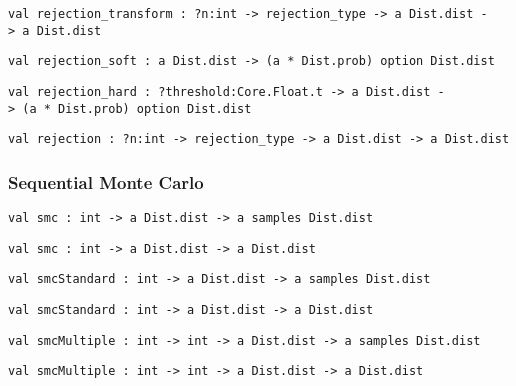 \protect\hyperlink{val-rejectionux5ftransform}{}\texttt{val\ rejection\_transform\ :\ ?⁠n:int\ -\textgreater{}\ rejection\_type\ -\textgreater{}\ \textquotesingle{}a\ Dist.dist\ -\textgreater{}\ \textquotesingle{}a\ Dist.dist}

\protect\hyperlink{val-rejectionux5fsoft}{}\texttt{val\ rejection\_soft\ :\ \textquotesingle{}a\ Dist.dist\ -\textgreater{}\ (\textquotesingle{}a\ *\ Dist.prob)\ option\ Dist.dist}

\protect\hyperlink{val-rejectionux5fhard}{}\texttt{val\ rejection\_hard\ :\ ?⁠threshold:Core.Float.t\ -\textgreater{}\ \textquotesingle{}a\ Dist.dist\ -\textgreater{}\ (\textquotesingle{}a\ *\ Dist.prob)\ option\ Dist.dist}

\protect\hyperlink{val-rejection}{}\texttt{val\ rejection\ :\ ?⁠n:int\ -\textgreater{}\ rejection\_type\ -\textgreater{}\ \textquotesingle{}a\ Dist.dist\ -\textgreater{}\ \textquotesingle{}a\ Dist.dist}

\hypertarget{infux5fsmc}{\subsubsection{\texorpdfstring{\protect\hyperlink{infux5fsmc}{}Sequential
Monte Carlo}{Sequential Monte Carlo}}\label{infux5fsmc}}

\protect\hyperlink{val-smc}{}\texttt{val\ smc\ :\ int\ -\textgreater{}\ \textquotesingle{}a\ Dist.dist\ -\textgreater{}\ \textquotesingle{}a\ samples\ Dist.dist}

\protect\hyperlink{val-smcux27}{}\texttt{val\ smc\textquotesingle{}\ :\ int\ -\textgreater{}\ \textquotesingle{}a\ Dist.dist\ -\textgreater{}\ \textquotesingle{}a\ Dist.dist}

\protect\hyperlink{val-smcStandard}{}\texttt{val\ smcStandard\ :\ int\ -\textgreater{}\ \textquotesingle{}a\ Dist.dist\ -\textgreater{}\ \textquotesingle{}a\ samples\ Dist.dist}

\protect\hyperlink{val-smcStandardux27}{}\texttt{val\ smcStandard\textquotesingle{}\ :\ int\ -\textgreater{}\ \textquotesingle{}a\ Dist.dist\ -\textgreater{}\ \textquotesingle{}a\ Dist.dist}

\protect\hyperlink{val-smcMultiple}{}\texttt{val\ smcMultiple\ :\ int\ -\textgreater{}\ int\ -\textgreater{}\ \textquotesingle{}a\ Dist.dist\ -\textgreater{}\ \textquotesingle{}a\ samples\ Dist.dist}

\protect\hyperlink{val-smcMultipleux27}{}\texttt{val\ smcMultiple\textquotesingle{}\ :\ int\ -\textgreater{}\ int\ -\textgreater{}\ \textquotesingle{}a\ Dist.dist\ -\textgreater{}\ \textquotesingle{}a\ Dist.dist}

